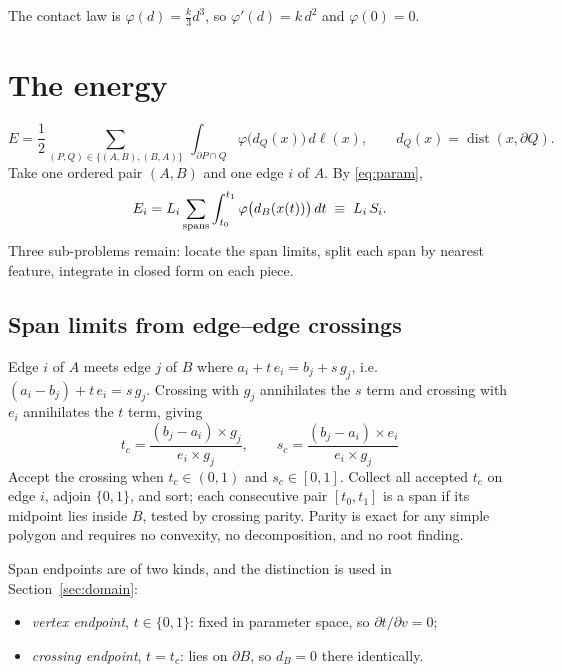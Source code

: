 \documentclass[11pt]{article}
\newcommand{\dist}{\operatorname{dist}}
\begin{document}
The contact law is $\varphi(d) = \tfrac{k}{3}d^3$, so $\varphi'(d) = k\,d^2$ and $\varphi(0) = 0$.

\section{The energy}
\label{sec:energy}

\begin{equation}
E = \frac{1}{2}\sum_{(P,Q)\in\{(A,B),(B,A)\}}\ \int_{\partial P\cap Q}\varphi\big(d_Q(x)\big)\,d\ell(x),
\qquad d_Q(x) = \dist(x,\partial Q).
\label{eq:master}
\end{equation}
Take one ordered pair $(A,B)$ and one edge $i$ of $A$. By \eqref{eq:param},
\begin{equation}
E_i = L_i \sum_{\rm spans}\int_{t_0}^{t_1}\varphi\big(d_B(x(t))\big)\,dt \;\equiv\; L_i\,S_i .
\label{eq:Ei}
\end{equation}
Three sub-problems remain: locate the span limits, split each span by nearest feature, integrate in closed form on each piece.

\subsection{Span limits from edge--edge crossings}

Edge $i$ of $A$ meets edge $j$ of $B$ where $a_i + t\,e_i = b_j + s\,g_j$, i.e.\ $(a_i-b_j) + t\,e_i = s\,g_j$. Crossing with $g_j$ annihilates the $s$ term and crossing with $e_i$ annihilates the $t$ term, giving
\begin{equation}
\boxed{\;t_c = \frac{(b_j-a_i)\times g_j}{e_i\times g_j}, \qquad
s_c = \frac{(b_j-a_i)\times e_i}{e_i\times g_j}\;}
\label{eq:cross}
\end{equation}
Accept the crossing when $t_c\in(0,1)$ and $s_c\in[0,1]$. Collect all accepted $t_c$ on edge $i$, adjoin $\{0,1\}$, and sort; each consecutive pair $[t_0,t_1]$ is a span if its midpoint lies inside $B$, tested by crossing parity. Parity is exact for any simple polygon and requires no convexity, no decomposition, and no root finding.

Span endpoints are of two kinds, and the distinction is used in Section~\ref{sec:domain}:
\begin{itemize}\itemsep1pt
\item \emph{vertex endpoint}, $t\in\{0,1\}$: fixed in parameter space, so $\partial t/\partial v = 0$;
\item \emph{crossing endpoint}, $t = t_c$: lies on $\partial B$, so $d_B = 0$ there identically.
\end{itemize}
\end{document}
